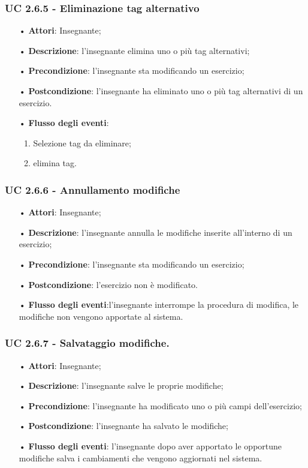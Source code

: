 \subsubsection{UC 2.6.5 - Eliminazione tag alternativo}
\begin{itemize}
	\item[•] \textbf{Attori}: Insegnante;
	\item[•] \textbf{Descrizione}: l'insegnante elimina uno o più tag alternativi;
	\item[•] \textbf{Precondizione}: l'insegnante sta modificando un esercizio;
	\item[•] \textbf{Postcondizione}: l'insegnante ha eliminato uno o più tag alternativi di un esercizio.
	\item[•] \textbf{Flusso degli eventi}:
\begin{enumerate}
		\item Selezione tag da eliminare;
		\item elimina tag.
\end{enumerate}
\end{itemize}

\subsubsection{UC 2.6.6 - Annullamento modifiche}
\begin{itemize}
	\item[•] \textbf{Attori}: Insegnante;
	\item[•] \textbf{Descrizione}: l'insegnante annulla le modifiche inserite all'interno di un esercizio; 
	\item[•] \textbf{Precondizione}: l'insegnante sta modificando un esercizio;
	\item[•] \textbf{Postcondizione}: l'esercizio non è modificato.
	\item[•] \textbf{Flusso degli eventi}:l'insegnante interrompe la procedura di modifica, le modifiche non vengono apportate al sistema.
\end{itemize}

\subsubsection{UC 2.6.7 - Salvataggio modifiche.} 
\begin{itemize}
	\item[•] \textbf{Attori}: Insegnante;
	\item[•] \textbf{Descrizione}: l'insegnante salve le proprie modifiche;
	\item[•] \textbf{Precondizione}: l'insegnante ha modificato uno o più campi dell'esercizio;
	\item[•] \textbf{Postcondizione}: l'insegnante ha salvato le modifiche;
	\item[•] \textbf{Flusso degli eventi}: l'insegnante dopo aver apportato le opportune modifiche salva i cambiamenti che vengono aggiornati nel sistema.
\end{itemize}


